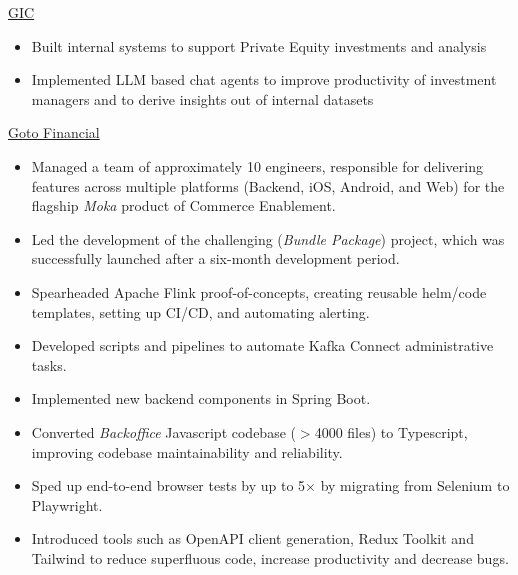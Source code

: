 \documentclass[]{cv} %
\begin{document}
\entry
{\href{https://www.gic.com.sg/}{GIC}}
{
\begin{itemize}
\item Built internal systems to support Private Equity investments and analysis
\item Implemented LLM based chat agents to improve productivity of investment managers and to derive insights out of internal datasets
\end{itemize}
}


\entry
{\href{https://gotofinancial.com/en}{Goto Financial}}
{
\begin{itemize}
\item Managed a team of approximately 10 engineers, responsible for delivering features across multiple platforms (Backend, iOS, Android, and Web) for the flagship \emph{Moka} product of Commerce Enablement.
\item Led the development of the challenging (\emph{Bundle Package}) project, which was successfully launched after a six-month development period.
\item Spearheaded Apache Flink proof-of-concepts, creating reusable helm/code templates, setting up CI/CD, and automating alerting.
\item Developed scripts and pipelines to automate Kafka Connect administrative tasks.
\item Implemented new backend components in Spring Boot.
\item Converted \emph{Backoffice} Javascript codebase ($> $4000 files) to Typescript, improving codebase maintainability and reliability.
\item Sped up end-to-end browser tests by up to 5$\times$ by migrating from Selenium to Playwright.
\item Introduced tools such as OpenAPI client generation, Redux Toolkit and Tailwind to reduce superfluous code, increase productivity and decrease bugs.
\end{itemize}
}
\end{document}
